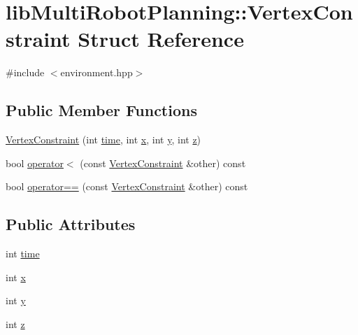 \hypertarget{structlib_multi_robot_planning_1_1_vertex_constraint}{}\section{lib\+Multi\+Robot\+Planning\+:\+:Vertex\+Constraint Struct Reference}
\label{structlib_multi_robot_planning_1_1_vertex_constraint}


{\ttfamily \#include $<$environment.\+hpp$>$}

\subsection*{Public Member Functions}
\begin{DoxyCompactItemize}
\item 
\hyperlink{structlib_multi_robot_planning_1_1_vertex_constraint_a00ed34edc97e7d319cb82895a674aca0}{Vertex\+Constraint} (int \hyperlink{structlib_multi_robot_planning_1_1_vertex_constraint_ab62401d4d3584fc5c66cf79fad96e722}{time}, int \hyperlink{structlib_multi_robot_planning_1_1_vertex_constraint_afb05b99124ee1ce12f5ff7cef319f651}{x}, int \hyperlink{structlib_multi_robot_planning_1_1_vertex_constraint_a4656247328499d5d834782a1c2762347}{y}, int \hyperlink{structlib_multi_robot_planning_1_1_vertex_constraint_a061a1cdc3d260b815a86467999c69623}{z})
\item 
bool \hyperlink{structlib_multi_robot_planning_1_1_vertex_constraint_a36c1e9a9154da12f2256a906759eecf7}{operator$<$} (const \hyperlink{structlib_multi_robot_planning_1_1_vertex_constraint}{Vertex\+Constraint} \&other) const
\item 
bool \hyperlink{structlib_multi_robot_planning_1_1_vertex_constraint_a82b29fb9265cded41e50cf726db90d11}{operator==} (const \hyperlink{structlib_multi_robot_planning_1_1_vertex_constraint}{Vertex\+Constraint} \&other) const
\end{DoxyCompactItemize}
\subsection*{Public Attributes}
\begin{DoxyCompactItemize}
\item 
int \hyperlink{structlib_multi_robot_planning_1_1_vertex_constraint_ab62401d4d3584fc5c66cf79fad96e722}{time}
\item 
int \hyperlink{structlib_multi_robot_planning_1_1_vertex_constraint_afb05b99124ee1ce12f5ff7cef319f651}{x}
\item 
int \hyperlink{structlib_multi_robot_planning_1_1_vertex_constraint_a4656247328499d5d834782a1c2762347}{y}
\item 
int \hyperlink{structlib_multi_robot_planning_1_1_vertex_constraint_a061a1cdc3d260b815a86467999c69623}{z}
\end{DoxyCompactItemize}
